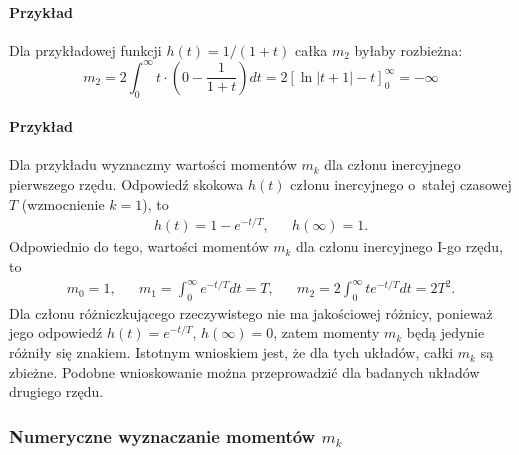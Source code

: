 \documentclass[paper=a4,DIV=12]{lpas}
\begin{document}
\begin{appendices}
  \paragraph{Przykład} Dla przykładowej funkcji $h(t)=1/(1+t)$ całka $m_2$
  byłaby rozbieżna:
  \begin{equation}
    m_2 = 2 \int_0^{\infty}{t\cdot\left(0 - \frac{1}{1+t}\right)dt}
        = 2 \left[\ln{|t+1| - t}\right]_0^{\infty}
        = -\infty
    \label{eq:VBGL6}
  \end{equation}

  \paragraph{Przykład} Dla przykładu wyznaczmy wartości momentów $m_k$ dla
  członu inercyjnego pierwszego rzędu. Odpowiedź skokowa $h(t)$ członu
  inercyjnego o~stałej czasowej $T$ (wzmocnienie $k=1$), to
  \begin{equation}
    \begin{aligned}
      & h(t) = 1 - e^{-t/T}, && h(\infty) = 1. &
    \end{aligned}
  \end{equation}
  Odpowiednio do tego, wartości momentów $m_k$ dla członu inercyjnego I-go
  rzędu, to
  \begin{equation}
    \begin{aligned}
      & m_0 = 1,   &
      & m_1 = \int_0^{\infty}{e^{-t/T} dt} = T,   &
      & m_2 = 2 \int_0^{\infty} {t e^{-t/T}dt} = 2 T^2. &
    \end{aligned}
  \end{equation}
  Dla członu różniczkującego rzeczywistego nie ma jakościowej różnicy, ponieważ
  jego odpowiedź $h(t) = e^{-t/T}$, $h(\infty) = 0$, zatem momenty $m_k$ będą
  jedynie różniły się znakiem. Istotnym wnioskiem jest, że dla tych układów,
  całki $m_k$ są zbieżne. Podobne wnioskowanie można przeprowadzić dla badanych
  układów drugiego rzędu.

  \subsubsection{Numeryczne wyznaczanie momentów \texorpdfstring{$m_k$}{mk}}
  \label{eq:MTP2Q}


\end{appendices}
\end{document}
